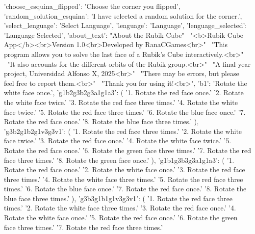 {{        'choose_esquina_flipped': 'Choose the corner you flipped',
        'random_solution_esquina': 'I have selected a random solution for the corner.',
        'select_lenguage': 'Select Language',
        'lenguage':        'Language',
        'lenguage_selected': 'Language Selected',
        'about_text':      "About the Rubik Cube" \
                            "<b>Rubik Cube App</b><br>Version 1.0<br>Developed by RanaCGames<br>" \
                            "This program allows you to solve the last face of a Rubik's Cube interactively.<br>" \
                            "It also accounts for the different orbits of the Rubik group.<br>" \
                            "A final-year project, Universidad Alfonso X, 2025<br>" \
                            "There may be errors, but please feel free to report them.<br>" \
                            "Thank you for using it!<br>",
        'b1': 'Rotate the white face once.',
        'g1b2g3b2g3a1g1a3': (
            '1. Rotate the red face once.\n'
            '2. Rotate the white face twice.\n'
            '3. Rotate the red face three times.\n'
            '4. Rotate the white face twice.\n'
            '5. Rotate the red face three times.\n'
            '6. Rotate the blue face once.\n'
            '7. Rotate the red face once.\n'
            '8. Rotate the blue face three times.'
        ),
        'g3b2g1b2g1v3g3v1': (
            '1. Rotate the red face three times.\n'
            '2. Rotate the white face twice.\n'
            '3. Rotate the red face once.\n'
            '4. Rotate the white face twice.\n'
            '5. Rotate the red face once.\n'
            '6. Rotate the green face three times.\n'
            '7. Rotate the red face three times.\n'
            '8. Rotate the green face once.'
        ),
        'g1b1g3b3g3a1g1a3': (
            '1. Rotate the red face once.\n'
            '2. Rotate the white face once.\n'
            '3. Rotate the red face three times.\n'
            '4. Rotate the white face three times.\n'
            '5. Rotate the red face three times.\n'
            '6. Rotate the blue face once.\n'
            '7. Rotate the red face once.\n'
            '8. Rotate the blue face three times.'
        ),
        'g3b3g1b1g1v3g3v1': (
            '1. Rotate the red face three times.\n'
            '2. Rotate the white face three times.\n'
            '3. Rotate the red face once.\n'
            '4. Rotate the white face once.\n'
            '5. Rotate the red face once.\n'
            '6. Rotate the green face three times.\n'
            '7. Rotate the red face three times.\n'
}}
